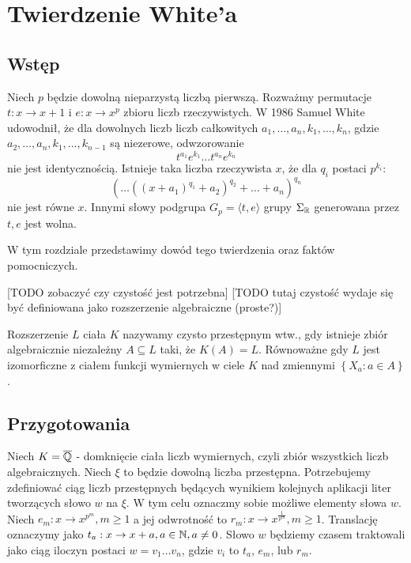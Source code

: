 \chapter{Twierdzenie White'a}
\label{ch:white_theorem}
\section{Wstęp}

Niech $p$ będzie dowolną nieparzystą liczbą pierwszą. Rozważmy permutacje $t :
x \rightarrow  x+1$ i $e: x \rightarrow x^p$ zbioru liczb rzeczywistych. W 1986
Samuel White \cite{whi88} udowodnił, że dla dowolnych liczb liczb całkowitych
$a_1, \ldots, a_n, k_1, \ldots, k_n$, gdzie $a_2, \ldots, a_n, k_1, \ldots,
k_{n-1}$ są niezerowe, odwzorowanie
\begin{equation*}
  t^{a_1}e^{k_1}\ldots t^{a_n}e^{k_n}
\end{equation*}
nie jest identycznością. Istnieje taka liczba rzeczywista $x$, że dla $q_i$
postaci $p^{k_i}$:
\begin{equation}
  \left( \ldots \left(\left(x + a_1\right)^{q_1} + a_2\right)^{q_2} +
    \ldots + a_n\right)^{q_n}
\label{eq:gp_element}
\end{equation}
nie jest równe $x$. Innymi słowy podgrupa $G_p = \langle t, e \rangle$ grupy
$\Sigma_{\mathbb{R}}$ generowana przez $t, e$ jest wolna.

W tym rozdziale przedstawimy dowód tego twierdzenia oraz faktów pomocniczych.

[TODO zobaczyć czy czystość jest potrzebna]
[TODO tutaj czystość wydaje się być definiowana jako rozszerzenie algebraiczne
(proste?)]
\begin{defin}
  Rozszerzenie $L$ ciała $K$ nazywamy czysto przestępnym wtw., gdy istnieje
  zbiór algebraicznie niezależny $A \subseteq L$ taki, że $K(A) = L$. Równoważne
  gdy $L$ jest izomorficzne z ciałem funkcji wymiernych w ciele $K$ nad
  zmiennymi $\left\{X_a : a \in A\right\}$.
\end{defin}

\section{Przygotowania}
\label{sec:preparation}
Niech $K = \overline{\mathbb{Q}}$ - domknięcie ciała liczb wymiernych, czyli zbiór
wszystkich liczb algebraicznych.
Niech $\xi$ to będzie dowolną liczba przestępna.
Potrzebujemy zdefiniować ciąg liczb przestępnych będących wynikiem kolejnych
aplikacji liter tworzących słowo $w$ na $\xi$.
W tym celu oznaczmy sobie możliwe elementy słowa $w$.
Niech $e_m: x \rightarrow x^{p^m}, m \geq 1$ a jej odwrotność to $r_m: x
\rightarrow x^{\frac{1}{p^m}}, m \geq 1$.
Translację oznaczymy jako $t_a: x \rightarrow x + a, a \in \mathbb{N}, a \neq 0$.
Słowo $w$ będziemy czasem traktowali jako ciąg iloczyn postaci $w =
v_1\ldots v_n$, gdzie $v_i$ to $t_a$, $e_m$, lub $r_m$.

